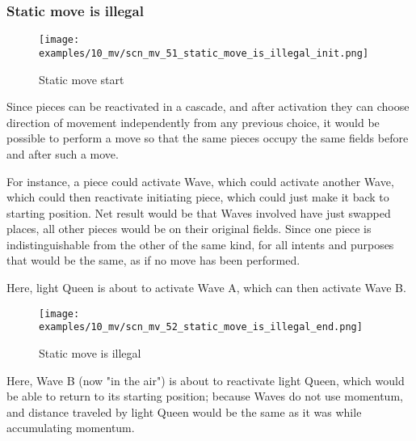 \subsubsection*{Static move is illegal}
\label{sec:Miranda's veil/Wave/Cascading Waves/Static move is illegal}

\vspace*{-1.4\baselineskip}
\noindent
\begin{figure}[!h]
\texttt{[image: examples/10\_mv/scn\_mv\_51\_static\_move\_is\_illegal\_init.png]}
\vspace*{-1.3\baselineskip}
\caption{Static move start}
\label{fig:scn_mv_51_static_move_is_illegal_init}
\end{figure}

\vspace*{-0.4\baselineskip}
Since pieces can be reactivated in a cascade, and after activation they can choose
direction of movement independently from any previous choice, it would be possible
to perform a move so that the same pieces occupy the same fields before and after
such a move.

For instance, a piece could activate Wave, which could activate another Wave, which
could then reactivate initiating piece, which could just make it back to starting
position. Net result would be that Waves involved have just swapped places, all other
pieces would be on their original fields. Since one piece is indistinguishable from
the other of the same kind, for all intents and purposes that would be the same, as
if no move has been performed.

Here, light Queen is about to activate Wave A, which can then activate Wave B.

\clearpage %

\vspace*{-2.1\baselineskip}
\noindent
\begin{figure}[!h]
\texttt{[image: examples/10\_mv/scn\_mv\_52\_static\_move\_is\_illegal\_end.png]}
\vspace*{-1.3\baselineskip}
\caption{Static move is illegal}
\label{fig:scn_mv_52_static_move_is_illegal_end}
\end{figure}

\vspace*{-0.4\baselineskip}
Here, Wave B (now "in the air") is about to reactivate light Queen, which would be
able to return to its starting position; because Waves do not use momentum, and
distance traveled by light Queen would be the same as it was while accumulating
momentum.

